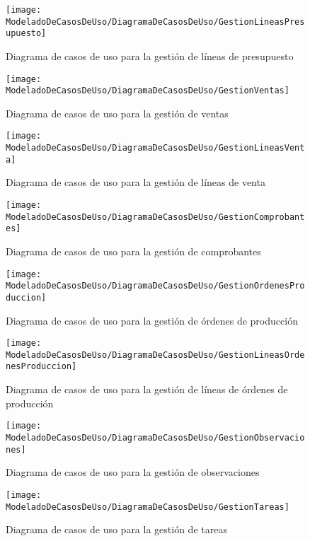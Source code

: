     \begin{figure}[H]
		\centering
		\texttt{[image: ModeladoDeCasosDeUso/DiagramaDeCasosDeUso/GestionLineasPresupuesto]}
		\caption{Diagrama de casos de uso para la gestión de líneas de presupuesto}
	\label{fig:GestionLineasPresupuesto}
    \end{figure}
    \begin{figure}[H]
		\centering
		\texttt{[image: ModeladoDeCasosDeUso/DiagramaDeCasosDeUso/GestionVentas]}
		\caption{Diagrama de casos de uso para la gestión de ventas}
	\label{fig:GestionVentas}
    \end{figure}
    \begin{figure}[H]
		\centering
		\texttt{[image: ModeladoDeCasosDeUso/DiagramaDeCasosDeUso/GestionLineasVenta]}
		\caption{Diagrama de casos de uso para la gestión de líneas de venta}
	\label{fig:GestionLineasVenta}
    \end{figure}
    \begin{figure}[H]
		\centering
		\texttt{[image: ModeladoDeCasosDeUso/DiagramaDeCasosDeUso/GestionComprobantes]}
		\caption{Diagrama de casos de uso para la gestión de comprobantes}
	\label{fig:GestionComprobantes}
    \end{figure}
    \begin{figure}[H]
		\centering
		\texttt{[image: ModeladoDeCasosDeUso/DiagramaDeCasosDeUso/GestionOrdenesProduccion]}
		\caption{Diagrama de casos de uso para la gestión de órdenes de producción}
	\label{fig:GestionOrdenesProduccion}
    \end{figure}
    \begin{figure}[H]
		\centering
		\texttt{[image: ModeladoDeCasosDeUso/DiagramaDeCasosDeUso/GestionLineasOrdenesProduccion]}
		\caption{Diagrama de casos de uso para la gestión de líneas de órdenes de producción}
	\label{fig:GestionLineasOrdenesProduccion}
    \end{figure}
    \begin{figure}[H]
		\centering
		\texttt{[image: ModeladoDeCasosDeUso/DiagramaDeCasosDeUso/GestionObservaciones]}
		\caption{Diagrama de casos de uso para la gestión de observaciones}
	\label{fig:GestionObservaciones}
	\end{figure}
	\begin{figure}[H]
		\centering
		\texttt{[image: ModeladoDeCasosDeUso/DiagramaDeCasosDeUso/GestionTareas]}
		\caption{Diagrama de casos de uso para la gestión de tareas}
	\label{fig:GestionObservaciones}
	\end{figure}
	\clearpage %
